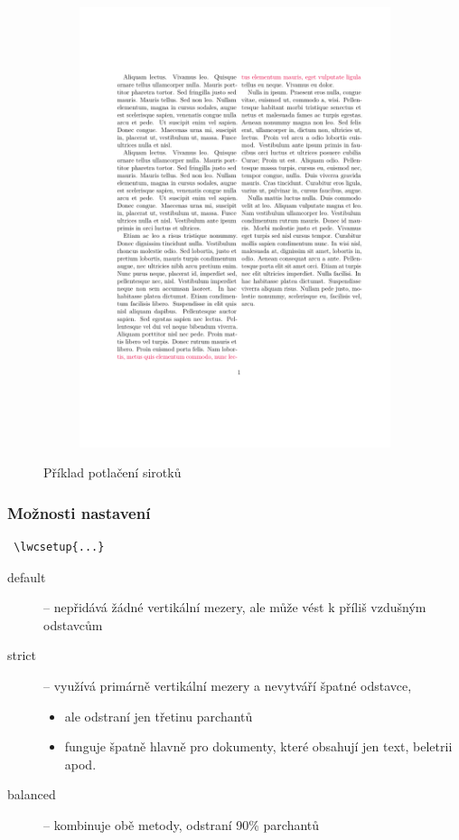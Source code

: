 \documentclass{csbulletin}
\begin{document}
\begin{figure}[htbp]
\begin{subfigure}[t]{0.45\textwidth}
\begin{center}
    \includegraphics[width=\textwidth,page=2]{examples/widow.pdf}
  \end{center}
\end{subfigure}
\caption{Příklad potlačení sirotků}
\label{fig:sirotek}
\end{figure}

  \subsubsection{Možnosti nastavení}
 \begin{verbatim}
 \lwcsetup{...}
 \end{verbatim}

 \begin{description}
   \item[default] -- nepřidává žádné vertikální mezery, ale může vést k příliš vzdušným odstavcům
   \item[strict] -- využívá primárně vertikální mezery a nevytváří špatné odstavce,  
     \begin{itemize}
       \item ale odstraní jen třetinu parchantů
        \item funguje špatně hlavně pro dokumenty, které obsahují jen text, beletrii apod.
      \end{itemize}
    \item[balanced] -- kombinuje obě metody, odstraní 90\% parchantů
  \end{description}
\end{document}
